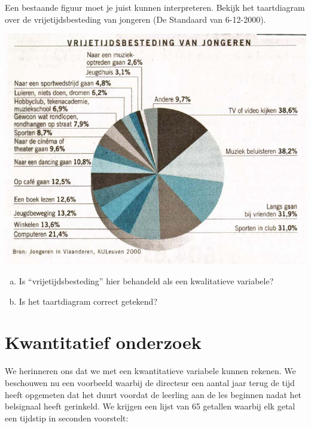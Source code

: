 \documentclass[12pt,twoside,a4paper]{article}
\begin{document}
\begin{oefening}
Een bestaande figuur moet je juist kunnen interpreteren. Bekijk het taartdiagram over de vrijetijdsbesteding van jongeren (De Standaard van 6-12-2000).

\begin{center}
  \includegraphics[width=1\textwidth]{cirkeldiagram-vrijetijdsbesteding}
\end{center}

\begin{enumerate}[(a)]
  \item Is “vrijetijdsbesteding” hier behandeld als een kwalitatieve variabele?
  \item Is het taartdiagram correct getekend?
\end{enumerate}
\end{oefening}

\cleardoublepage
\section{Kwantitatief onderzoek}

We herinneren ons dat we met een kwantitatieve variabele kunnen rekenen. We beschouwen nu een voorbeeld waarbij de directeur een aantal jaar terug de tijd heeft opgemeten dat het duurt voordat de leerling aan de les beginnen nadat het belsignaal heeft gerinkeld. We krijgen een lijst van 65 getallen waarbij elk getal een tijdstip in seconden voorstelt:

\end{document}
